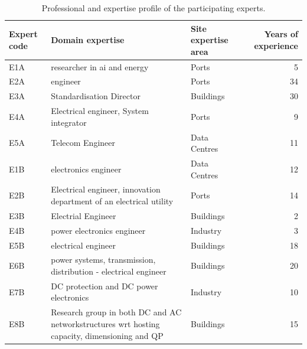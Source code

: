 \begin{table}[htbp]
\caption{Professional and expertise profile of the participating experts.}
\label{tab:expert_detailed_profile}
\begin{tabular}{lp{7.0cm}p{2.6cm}r}
\toprule
Expert code & Domain expertise & Site expertise area & Years of experience \\
\midrule
E1A & researcher in ai and energy & Ports & 5 \\
E2A & engineer & Ports & 34 \\
E3A & Standardisation Director & Buildings & 30 \\
E4A & Electrical engineer, System integrator & Ports & 9 \\
E5A & Telecom Engineer & Data Centres & 11 \\
E1B & electronics engineer & Data Centres & 12 \\
E2B & Electrical engineer, innovation department of an electrical utility & Ports & 14 \\
E3B & Electrial Engineer & Buildings & 2 \\
E4B & power electronics engineer & Industry & 3 \\
E5B & electrical engineer & Buildings & 18 \\
E6B & power systems, transmission, distribution - electrical engineer & Buildings & 20 \\
E7B & DC protection and DC power electronics & Industry & 10 \\
E8B & Research group in both DC and AC networkstructures wrt hosting capacity, dimensioning and QP & Buildings & 15 \\
\bottomrule
\end{tabular}
\end{table}
